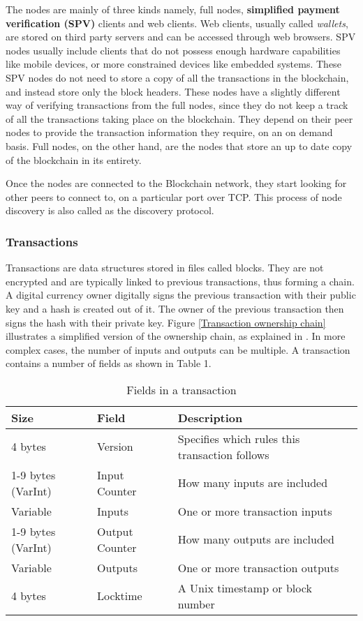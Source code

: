 \documentclass[english]{tktltiki}
\begin{document}
The nodes are mainly of three kinds namely, full nodes, \textbf{simplified payment verification (SPV)} clients and web clients. Web clients, usually called \textit{wallets}, are stored on third party servers and can be accessed through web browsers. SPV nodes usually include clients that do not possess enough hardware capabilities like mobile devices, or more constrained devices like embedded systems. These SPV nodes do not need to store a copy of all the transactions in the blockchain, and instead store only the block headers. These nodes have a slightly different way of verifying transactions from the full nodes, since they do not keep a track of all the transactions taking place on the blockchain. They depend on their peer nodes to provide the transaction information they require, on an on demand basis. Full nodes, on the other hand, are the nodes that store an up to date copy of the blockchain in its entirety. 


Once the nodes are connected to the Blockchain network, they start looking for other peers to connect to, on a particular port over TCP. This process of node discovery is also called as the discovery protocol.
\subsubsection{Transactions}

Transactions are data structures stored in files called blocks. They are not encrypted and are typically linked to previous transactions, thus forming a chain. A digital currency owner digitally signs the previous transaction with their public key and a hash is created out of it. The owner of the previous transaction then signs the hash with their private key. Figure \ref{Transaction ownership chain} illustrates a simplified version of the ownership chain, as explained in \cite{bitcoin}. In more complex cases, the number of inputs and outputs can be multiple. A transaction contains a number of fields as shown in Table 1.\newline
\begin{table}[H]
\centering
\label{table:transaction_fields}
\begin{tabular}{|l|l|l|}
\hline
\textbf{Size}      & \textbf{Field} & \textbf{Description} \\ \hline
4 bytes            & Version        & Specifies which rules this transaction follows \\ \hline
1-9 bytes (VarInt) & Input Counter  & How many inputs are included                   \\ \hline
Variable           & Inputs         & One or more transaction inputs                 \\ \hline
1-9 bytes (VarInt) & Output Counter & How many outputs are included                  \\ \hline
Variable           & Outputs        & One or more transaction outputs                \\ \hline
4 bytes            & Locktime       & A Unix timestamp or block number               \\ \hline
\end{tabular}
\caption{Fields in a transaction}
\end{table}
\end{document}
